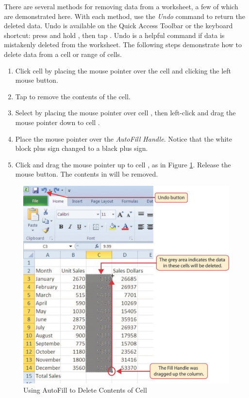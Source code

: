 There are several methods for removing data from a worksheet, a few of which are demonstrated here. With each method, use the \textit{Undo} command to return the deleted data. Undo is available on the Quick Access Toolbar or the keyboard shortcut: press and hold , then tap . Undo is a helpful command if data is mistakenly deleted from the worksheet. The following steps demonstrate how to delete data from a cell or range of cells.

\begin{enumbox}
	\begin{enumerate}
		\item Click cell  by placing the mouse pointer over the cell and clicking the left mouse button.
		\item Tap  to remove the contents of the cell.
		\item Select  by placing the mouse pointer over cell , then left-click and drag the mouse pointer down to cell .
		\item Place the mouse pointer over the \textit{AutoFill Handle}. Notice that the white block plus sign changed to a black plus sign.
		\item Click and drag the mouse pointer up to cell , as in Figure \ref{01:fig21}. Release the mouse button. The contents in  will be removed.
	\end{enumerate}
\end{enumbox}

\begin{figure}[H]
	\centering
	\includegraphics[width=\maxwidth{.95\linewidth}]{gfx/ch01_fig21}
	\caption{Using AutoFill to Delete Contents of Cell}
	\label{01:fig21}
\end{figure}


